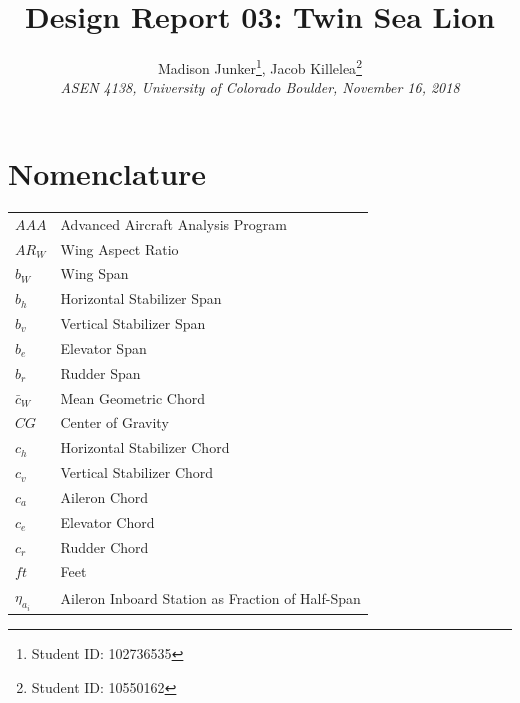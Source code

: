 \documentclass[conf]{new-aiaa}
\title{Design Report 03: Twin Sea Lion}
\author{
    Madison Junker\footnote{Student ID: 102736535 }, Jacob Killelea\footnote{Student ID: 10550162 } \\
    \emph{ASEN 4138, University of Colorado Boulder, November 16, 2018}
}
\begin{document}
\clearpage
\maketitle
\thispagestyle{empty}

\newpage
{}
\tableofcontents
{}
\listoffigures
{}
\listoftables
\newpage
\printnomenclature[25mm]

\section*{Nomenclature}

{\renewcommand\arraystretch{1.0}
\noindent\begin{longtable*}{@{}l @{\quad=\quad} l@{}}
$AAA$     	               & Advanced Aircraft Analysis Program \\
$AR_W$    	               & Wing Aspect Ratio          \\
$b_W$	  	               & Wing Span                  \\
$b_h$	  	               & Horizontal Stabilizer Span \\
$b_v$	  	               & Vertical Stabilizer Span   \\
$b_e$	  	               & Elevator Span   \\
$b_r$	  	               & Rudder Span   \\
$\bar{c}_W$	  	           & Mean Geometric Chord               \\
$CG$	  	               & Center of Gravity \\
$c_h$	  	               & Horizontal Stabilizer Chord \\
$c_v$	  	               & Vertical Stabilizer Chord \\
$c_a$	  	               & Aileron Chord \\
$c_e$	  	               & Elevator Chord \\
$c_r$	  	               & Rudder Chord \\
$ft$	  	               & Feet \\
$\eta_{a_i}$               & Aileron Inboard Station as Fraction of Half-Span \\

\end{longtable*}}
\end{document}
